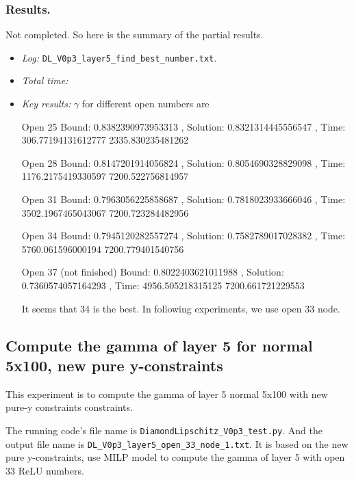 \documentclass{llncs}
\begin{document}
\subsubsection*{Results.}

Not completed. So here is the summary of the partial results.

\begin{itemize}
	\item \emph{Log:} \verb*|DL_V0p3_layer5_find_best_number.txt|.
	
	\item \emph{Total time:} 
	
	\item \emph{Key results:}  $\gamma$ for different open numbers are 
	
	Open 25 
	Bound: 0.8382390973953313 , Solution: 0.8321314445556547 , Time: 306.77194131612777 2335.830235481262
	
	Open 28 
	Bound: 0.8147201914056824 , Solution: 0.8054690328829098 , Time: 1176.2175419330597 7200.522756814957
	
	Open 31 
	Bound: 0.7963056225858687 , Solution: 0.7818023933666046 , Time: 3502.1967465043067 7200.723284482956
	
	Open 34 
	Bound: 0.7945120282557274 , Solution: 0.7582789017028382 , Time: 5760.061596000194 7200.779401540756
	
	Open 37 (not finished) 
	Bound: 0.8022403621011988 , Solution: 0.7360574057164293 , Time: 4956.505218315125 7200.661721229553
	
	It seems that 34 is the best. In following experiments, we use open 33 node.
	
\end{itemize}






\subsection{Compute the gamma of layer 5 for normal 5x100, new pure y-constraints}

This experiment is to  compute the gamma of layer 5 normal 5x100 with new pure-y constraints constraints.

\vspace*{1ex}

The running code's file name is \verb*|DiamondLipschitz_V0p3_test.py|. And the output file name is \verb*|DL_V0p3_layer5_open_33_node_1.txt|.  It is based on the new pure y-constraints, use MILP model to compute the gamma of layer 5 with open 33 ReLU numbers.
\end{document}

